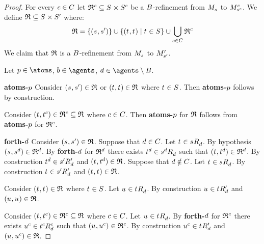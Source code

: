 \begin{proof}
For every $\agentC \in \agentsC$ let $\refinement^\agentC \subseteq \kStates \times \kStates[\agentC]$ be a $\agentsB$-refinement from $\kPModel{\kStateS}$ to $\kPModel[\agentC]{\kStateS[\agentC]}$.
We define $\refinement \subseteq \kStates \times \kStatesP$ where:
$$
\refinement = \{(\kStateS, \kStateSP)\} \cup \{(\kStateT, \kStateT) \mid \kStateT \in \kStates\} \cup \bigcup_{\agentC \in \agentsC} \refinement^\agentC
$$
We claim that $\refinement$ is a $\agentsB$-refinement from $\kPModel{\kStateS}$ to $\kPModelP{\kStateSP}$.

Let $\atomP \in \atoms$, $\agentB \in \agents$, $\agentD \in \agents \setminus \agentsB$.

{\bf atoms-$\atomP$}
Consider $(\kStateS, \kStateSP) \in \refinement$ or $(\kStateT, \kStateT) \in \refinement$ where $\kStateT \in \kStates$.
Then {\bf atoms-$\atomP$} follows by construction.

Consider $(\kStateT, \kStateT[\agentC]) \in \refinement^\agentC \subseteq \refinement$ where $\agentC \in \agentsC$.
Then {\bf atoms-$\atomP$} for $\refinement$ follows from {\bf atoms-$\atomP$} for $\refinement^\agentC$.

{\bf forth-$\agentD$}
Consider $(\kStateS, \kStateSP) \in \refinement$.
Suppose that $\agentD \in \agentsC$.
Let $\kStateT \in \kSuccessorsD{\kStateS}$.
By hypothesis $(\kStateS, \kStateS[\agentD]) \in \refinement^\agentD$.
By {\bf forth-$\agentD$} for $\refinement^\agentD$ there exists $\kStateT[\agentD] \in \kSuccessorsD{\kStateS[\agentD]}$ such that $(\kStateT, \kStateT[\agentD]) \in \refinement^\agentD$.
By construction $\kStateT[\agentD] \in \kSuccessorsPD{\kStateSP}$ and $(\kStateT, \kStateT[\agentD]) \in \refinement$.
Suppose that $\agentD \notin \agentsC$.
Let $\kStateT \in \kSuccessorsD{\kStateS}$.
By construction $\kStateT \in \kSuccessorsPD{\kStateSP}$ and $(\kStateT, \kStateT) \in \refinement$.

Consider $(\kStateT, \kStateT) \in \refinement$ where $\kStateT \in \kStates$.
Let $\kStateU \in \kSuccessorsD{\kStateT}$.
By construction $\kStateU \in \kSuccessorsPD{\kStateT}$ and $(\kStateU, \kStateU) \in \refinement$.

Consider $(\kStateT, \kStateT[\agentC]) \in \refinement^\agentC \subseteq \refinement$ where $\agentC \in \agentsC$.
Let $\kStateU \in \kSuccessorsD{\kStateT}$.
By {\bf forth-$\agentD$} for $\refinement^\agentC$ there exists $\kStateU[\agentC] \in \kSuccessorsD[\agentC]{\kStateT[\agentC]}$ such that $(\kStateU, \kStateU[\agentC]) \in \refinement^\agentC$.
By construction $\kStateU[\agentC] \in \kSuccessorsPD{\kStateT}$ and $(\kStateU, \kStateU[\agentC]) \in \refinement$.


\end{proof}
